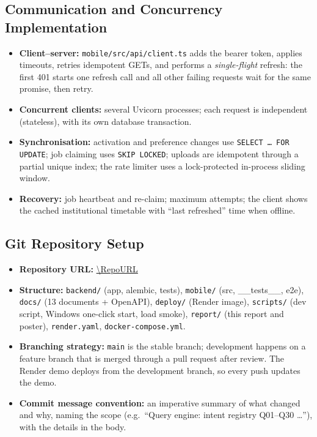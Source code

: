 \subsection{Communication and Concurrency Implementation}
\begin{itemize}
\item \textbf{Client--server:} \texttt{mobile/src/api/client.ts} adds the bearer token, applies
      timeouts, retries idempotent GETs, and performs a \emph{single-flight} refresh: the first 401
      starts one refresh call and all other failing requests wait for the same promise, then retry.
\item \textbf{Concurrent clients:} several Uvicorn processes; each request is independent
      (stateless), with its own database transaction.
\item \textbf{Synchronisation:} activation and preference changes use \texttt{SELECT \ldots{} FOR
      UPDATE}; job claiming uses \texttt{SKIP LOCKED}; uploads are idempotent through a partial unique index;
      the rate limiter uses a lock-protected in-process sliding window.
\item \textbf{Recovery:} job heartbeat and re-claim; maximum attempts; the client shows the cached
      institutional timetable with ``last refreshed'' time when offline.
\end{itemize}

\subsection{Git Repository Setup}
\begin{itemize}
\item \textbf{Repository URL:} \url{\RepoURL}
\item \textbf{Structure:} \texttt{backend/} (app, alembic, tests), \texttt{mobile/} (src, \_\_tests\_\_, e2e),
      \texttt{docs/} (13 documents + OpenAPI), \texttt{deploy/} (Render image), \texttt{scripts/}
      (dev script, Windows one-click start, load smoke), \texttt{report/} (this report and poster),
      \texttt{render.yaml}, \texttt{docker-compose.yml}.
\item \textbf{Branching strategy:} \texttt{main} is the stable branch; development happens on a feature
      branch that is merged through a pull request after review. The Render demo deploys from the
      development branch, so every push updates the demo.
\item \textbf{Commit message convention:} an imperative summary of what changed and why, naming the
      scope (e.g.\ ``Query engine: intent registry Q01--Q30 \ldots''), with the details in the body.
\end{itemize}

